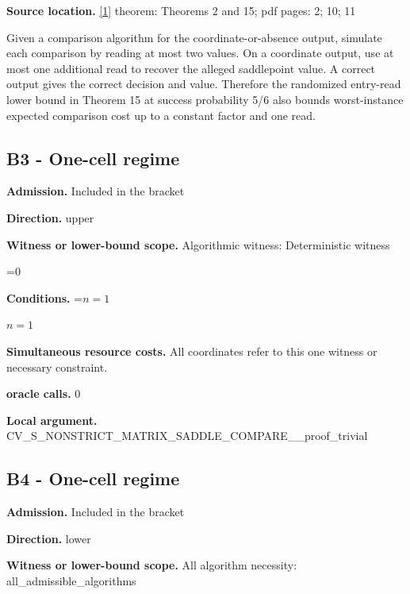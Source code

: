 \documentclass[10pt,a4paper]{article}
\newcommand{\AtlasMath}[1]{\par\begingroup\centering\setbox0=\hbox{$\displaystyle #1$}\ifdim\wd0>1.4\linewidth\typeout{ATLAS WIDE FORMULA: \the\wd0}\fi\ifdim\wd0>\linewidth\resizebox{\linewidth}{!}{\box0}\else\box0\fi\par\endgroup}
\newcommand{\AtlasInlineMath}[1]{\begingroup\setbox0=\hbox{$#1$}\ifdim\wd0>.4\linewidth\endgroup\AtlasMath{#1}\else\endgroup$#1$\fi}
\begin{document}
\textbf{Source location.} \href{https://doi.org/10.4230/LIPIcs.ESA.2024.44}{[1]} theorem: Theorems 2 and 15; pdf pages: 2; 10; 11



Given a comparison algorithm for the coordinate-or-absence output, simulate each comparison by reading at most two values. On a coordinate output, use at most one additional read to recover the alleged saddlepoint value. A correct output gives the correct decision and value. Therefore the randomized entry-read lower bound in Theorem 15 at success probability 5/6 also bounds worst-instance expected comparison cost up to a constant factor and one read.



\subsection{B3 - One-cell regime}


\textbf{Admission.} Included in the bracket



\textbf{Direction.} upper



\textbf{Witness or lower-bound scope.} Algorithmic witness: Deterministic witness



\AtlasMath{0}


\textbf{Conditions.} \AtlasInlineMath{n=1}



\textbf{Simultaneous resource costs.} All coordinates refer to this one witness or necessary constraint.



\textbf{oracle calls.} 0



\textbf{Local argument.} CV\_S\_NONSTRICT\_MATRIX\_SA\allowbreak{}DDLE\_COMPARE\_\_proof\_triv\allowbreak{}ial



\subsection{B4 - One-cell regime}


\textbf{Admission.} Included in the bracket



\textbf{Direction.} lower



\textbf{Witness or lower-bound scope.} All algorithm necessity: all\_admissible\_algorithms
\end{document}

